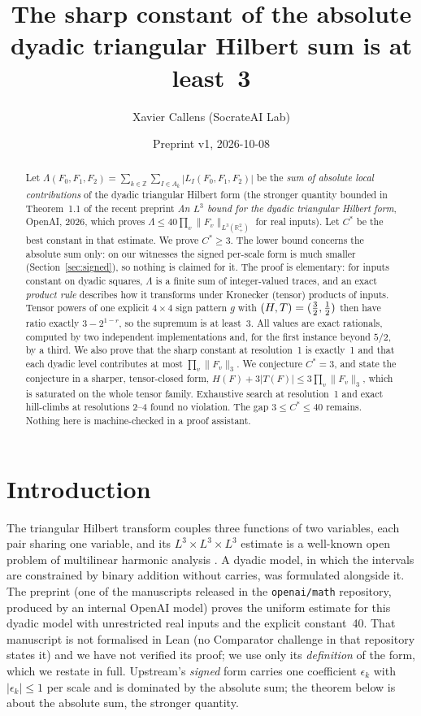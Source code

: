 \documentclass[11pt]{article}
\title{The sharp constant of the absolute dyadic triangular Hilbert sum is at least~3}
\author{Xavier Callens (SocrateAI Lab)}
\date{Preprint v1, 2026-10-08}
\theoremstyle{remark}
\newcommand{\R}{\mathbb{R}}
\newcommand{\Z}{\mathbb{Z}}
\newcommand{\Lam}{\Lambda}
\begin{document}
\maketitle

\begin{abstract}
Let $\Lam(F_0,F_1,F_2)=\sum_{k\in\Z}\sum_{I\in A_k}|L_I(F_0,F_1,F_2)|$ be the \emph{sum of absolute local contributions}
of the dyadic triangular Hilbert form (the stronger quantity bounded in Theorem~1.1 of the recent preprint \emph{An $L^3$ bound for the dyadic triangular
Hilbert form}, OpenAI, 2026, which proves $\Lam\le 40\prod_v\|F_v\|_{L^3(\R_+^2)}$ for real inputs). Let $C^\ast$ be the
best constant in that estimate. We prove $C^\ast\ge 3$. The lower bound concerns the absolute sum only: on our witnesses
the signed per-scale form is much smaller (Section~\ref{sec:signed}), so nothing is claimed for it. The proof is elementary: for inputs constant on dyadic squares, $\Lam$ is a finite
sum of integer-valued traces, and an exact \emph{product rule} describes how it transforms under Kronecker (tensor)
products of inputs. Tensor powers of one explicit $4\times4$ sign pattern $g$ with $(H,T)=(\tfrac{3}{2},\tfrac{1}{2})$ then have ratio
exactly $3-2^{1-r}$, so the supremum is at least~3. All values are exact rationals, computed by two independent
implementations and, for the first instance beyond $5/2$, by a third. We also prove that the sharp constant at
resolution~1 is exactly~1 and that each dyadic level contributes at most $\prod_v\|F_v\|_3$. We conjecture $C^\ast=3$,
and state the conjecture in a sharper, tensor-closed form, $H(F)+3|T(F)|\le3\prod_v\|F_v\|_3$, which is saturated on the
whole tensor family. Exhaustive search at resolution~1 and exact hill-climbs at resolutions 2--4 found no violation.
The gap $3\le C^\ast\le 40$ remains. Nothing here is machine-checked in a proof assistant.
\end{abstract}

\section{Introduction}

The triangular Hilbert transform couples three functions of two variables, each pair sharing one variable, and its
$L^3\times L^3\times L^3$ estimate is a well-known open problem of multilinear harmonic analysis
\cite{thieleproblems,ktzk2015}. A dyadic model, in which the intervals are constrained by binary addition without
carries, was formulated alongside it. The preprint \cite{oai2026dyadic} (one of the manuscripts released in the
\texttt{openai/math} repository, produced by an internal OpenAI model) proves the uniform estimate for this dyadic
model with unrestricted real inputs and the explicit constant~40. That manuscript is not formalised in Lean (no Comparator challenge in that repository states it) and we have
not verified its proof; we use only its \emph{definition} of the form, which we restate in full. Upstream's
\emph{signed} form carries one coefficient $\epsilon_k$ with $|\epsilon_k|\le1$ per scale and is dominated by the
absolute sum; the theorem below is about the absolute sum, the stronger quantity.
\end{document}
